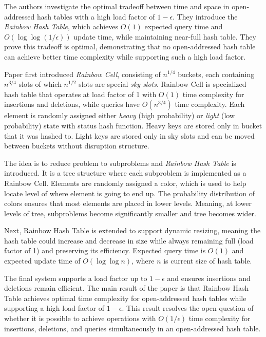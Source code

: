 
The authors investigate the optimal tradeoff between time and space in open-addressed hash tables with a high load factor of $1 - \epsilon$. They introduce the \textit{Rainbow Hash Table}, which achieves $O(1)$ expected query time and $O(\log\log(1/\epsilon))$ update time, while maintaining near-full hash table. They prove this tradeoff is optimal, demonstrating that no open-addressed hash table can achieve better time complexity while supporting such a high load factor.

Paper first introduced \textit{Rainbow Cell}, consisting of $n^{1/4}$ buckets, each containing $n^{3/4}$ slots of which $n^{1/2}$ slots are special \textit{sky slots}.
Rainbow Cell is specialized hash table that operates at load factor of 1 with $O(1)$
time complexity for insertions and deletions, while queries have $O(n^{3/4})$ time
complexity. Each element is randomly assigned either \textit{heavy} (high probability) or \textit{light} (low probability) state with status hash function. Heavy keys are stored only in bucket that it was hashed to. Light keys are stored only in sky slots and can be moved between buckets without disruption structure.

The idea is to reduce problem to subproblems and \textit{Rainbow Hash Table} is introduced. It is a tree structure where each subproblem is implemented as a Rainbow Cell. Elements are randomly assigned a color, which is used to help locate level of where element is going to end up. The probability distribution of colors ensures that most elements are placed in lower levels. Meaning, at lower levels of tree, subproblems become significantly smaller and tree becomes wider. 

Next, Rainbow Hash Table is extended to support dynamic resizing, meaning the hash table could increase and decrease in size while always remaining full (load factor of 1) and preserving its efficiency. Expected query time is $O(1)$ and expected update time of $O(\log\log n)$, where $n$ is current size of hash table. 

The final system supports a load factor up to $1 - \epsilon$ and ensures insertions and deletions remain efficient. The main result of the paper is that Rainbow Hash Table achieves optimal time complexity for open-addressed hash tables while supporting a high load factor of $1 - \epsilon$. This result resolves the open question of whether it is possible to achieve operations with $O(1/\epsilon)$ time complexity for insertions, deletions, and queries simultaneously in an open-addressed hash table.